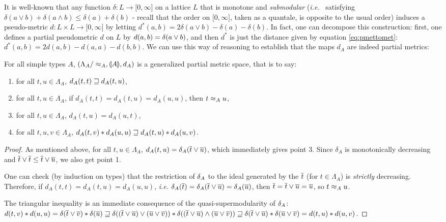 It is well-known  \cite{6845021} that any 
function $\delta: L\to \mathbb [0,\infty]$ on a lattice $L$ that is monotone and \emph{submodular}  (\emph{i.e.}~ satisfying $\delta(a\vee b)+ \delta(a\wedge b) \leq \delta(a)+\delta(b)$ - recall that the order on $\mathbb [0,\infty]$, taken as a quantale, is opposite to the usual order) induces a pseudo-metric $d: L\times L \to \mathbb [0,\infty]$ by letting $d^*(a,b)=2\delta(a\vee b)-\delta(a)-\delta(b)$. In fact, one can decompose this construction: first, one defines a partial pseudometric $d$ on $L$ by $d(a,b) = \delta(a \vee b)$, and then $d^*$ is just the distance given by equation \eqref{eq:pmettomet}: $d^*(a,b) = 2d(a,b)-d(a,a)-d(b,b)$. We can use this way of reasoning to establish that the maps $d_{A}$ are indeed partial metrics:

\begin{corollary} \label{corollary:stlc-metric} For all simple types $A$, $\left(\Lambda_A/\approx_A, \llparenthesis A \rrparenthesis, d_A\right)$ is a generalized partial metric space, that is to say:
\begin{enumerate}
\item for all $t,u \in \Lambda_A$, $d_A(t,t) \sqsupseteq d_A(t,u)$,
\item for all $t,u \in \Lambda_A$, if $d_A(t,t) = d_A(t,u) = d_A(u,u)$, then $t \approx_A u$,
\item for all $t,u \in \Lambda_A$, $d_A(t,u) = d_A(u,t)$,
\item for all $t,u,v \in \Lambda_A$, $d_A(t,v) \mathbin{\ast} d_A(u,u) \sqsupseteq d_A(t,u) \mathbin{\ast} d_A(u,v)$.
\end{enumerate}
\end{corollary}
\begin{proof}
As mentioned above, for all $t,u\in\Lambda_A$, $d_A(t,u) = \delta_A(\overline{t} \vee \overline{u})$, which immediately gives point 3. Since $\delta_A$ is monotonically decreasing and $\overline{t} \vee \overline{t} \leq \overline{t} \vee \overline{u}$, we also get point 1.

One can check (by induction on types) that the restriction of $\delta_A$ to the ideal generated by the $\overline{t}$ (for $t \in \Lambda_A$) is \emph{strictly} decreasing. Therefore, if  $d_A(t,t) = d_A(t,u) = d_A(u,u)$, \textit{i.e.} $\delta_A(\overline{t}) = \delta_A(\overline{t} \vee \overline{u}) = \delta_A(\overline{u})$,  then $\overline{t} = \overline{t} \vee \overline{u} = \overline{u}$, so $t \approx_A u$.

The triangular inequality is an immediate consequence of the quasi-supermodularity of $\delta_A$: $d(t,v) \mathbin{\ast} d(u,u) = \delta(\overline{t} \vee \overline{v}) \mathbin{\ast} \delta(\overline{u}) \sqsupseteq \delta((\overline{t} \vee \overline{u}) \vee (\overline{u} \vee \overline{v})) \mathbin{\ast} \delta((\overline{t} \vee \overline{u}) \wedge (\overline{u} \vee \overline{v})) \sqsupseteq \delta(\overline{t} \vee  \overline{u}) \mathbin{\ast} \delta(\overline{u} \vee  \overline{v}) = d(t,u) \mathbin{\ast} d(u,v)$.
\end{proof}

